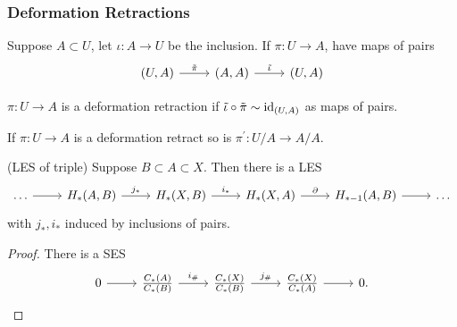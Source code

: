 \documentclass[a4paper,11pt]{article}
\begin{document}
			\subsubsection*{Deformation Retractions}
				Suppose $A\subset U$, let $\iota:A\rightarrow U$ be the inclusion. If $\pi:U\rightarrow A$, have maps of pairs
				\begin{equation*}
					\begin{tikzcd}
						(U,A)\ar[r,"\tilde{\pi}"]& (A,A)\ar[r,"\tilde{\iota}"]& (U,A)
					\end{tikzcd}
				\end{equation*}

				\begin{defi}
					$\pi:U\rightarrow A$ is a deformation retraction if $\tilde{\iota}\circ\tilde{\pi}\sim\operatorname{id}_{(U,A)}$ as maps of pairs.
				\end{defi}

				\begin{lemma}\label{lem--1}
					If $\pi:U\rightarrow A$ is a deformation retract so is $\pi^{\prime}:U/A\rightarrow A/A$.
				\end{lemma}

				\begin{lemma}
					(LES of triple) Suppose $B\subset A\subset X$. Then there is a LES
					\begin{equation*}
						\begin{tikzcd}
							\dots\ar[r]& \hg{A,B}\ar[r,"j_\ast"]& \hg{X,B}\ar[r,"i_\ast"]& \hg{X,A}\ar[r,"\partial"]& \hg[\ast-1]{A,B}\ar[r]& \dots 
						\end{tikzcd}
					\end{equation*}
					with $j_\ast,i_\ast$ induced by inclusions of pairs.	
				\end{lemma}
				\begin{proof}
					There is a SES
					\begin{equation*}
						\begin{tikzcd}
							0\ar[r]& \frac{\cx{A}}{\cx{B}}\ar[r,"i_\#"]& \frac{\cx{X}}{\cx{B}}\ar[r,"j_\#"]& \frac{\cx{X}}{\cx{A}}\ar[r]& 0.
						\end{tikzcd}
					\end{equation*}
				\end{proof}
\end{document}
